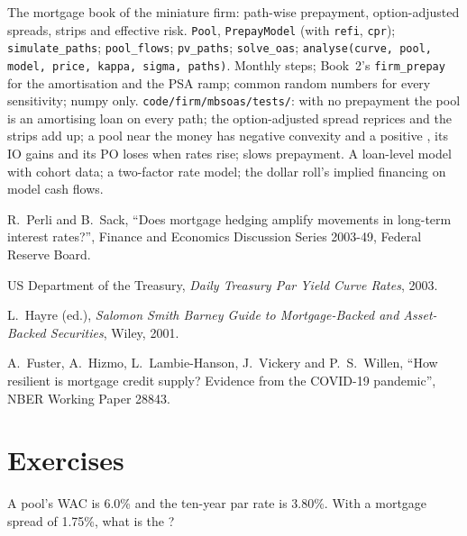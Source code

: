 \begin{build}
 The mortgage book of the miniature firm: path-wise prepayment,
option-adjusted spreads, strips and effective risk.
 \texttt{Pool}, \texttt{PrepayModel} (with \texttt{refi},
\texttt{cpr}); \texttt{simulate\_paths}; \texttt{pool\_flows}; \texttt{pv\_paths};
\texttt{solve\_oas}; \texttt{analyse(curve, pool, model, price, kappa, sigma, paths)}.
 Monthly steps; Book~2's \texttt{firm\_prepay} for the amortisation and the
PSA ramp; common random numbers for every sensitivity; numpy only.
 \texttt{code/firm/mbsoas/tests/}: with no prepayment the pool is
an amortising loan on every path; the option-adjusted spread reprices and the strips add
up; a pool near the money has negative convexity and a positive , its IO
gains and its PO loses when rates rise;  slows prepayment.
 A loan-level model with cohort data; a two-factor rate model; the
dollar roll's implied financing on model cash flows.
\end{build}

\begin{omsources}
\item R.\ Perli and B.\ Sack, ``Does mortgage hedging amplify movements in long-term
interest rates?'', Finance and Economics Discussion Series 2003-49, Federal Reserve Board.
\item US Department of the Treasury, \emph{Daily Treasury Par Yield Curve Rates}, 2003.
\item L.\ Hayre (ed.), \emph{Salomon Smith Barney Guide to Mortgage-Backed and
Asset-Backed Securities}, Wiley, 2001.
\item A.\ Fuster, A.\ Hizmo, L.\ Lambie-Hanson, J.\ Vickery and P.\ S.\ Willen, ``How resilient is
mortgage credit supply? Evidence from the COVID-19 pandemic'', NBER Working Paper 28843.
\end{omsources}

\section{Exercises}

\begin{exercise}[$\star$]\label{exo:rc:mortgage-modelling:1}
A pool's WAC is 6.0\% and the ten-year par rate is 3.80\%. With a mortgage spread of 1.75\%,
what is the ?
\end{exercise}

